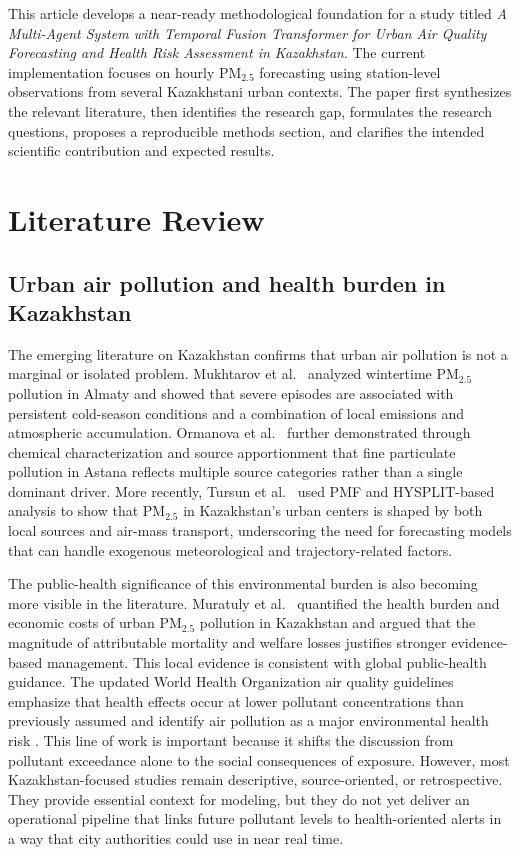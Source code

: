\documentclass[pdflatex,sn-mathphys-num]{sn-jnl}
\begin{document}
This article develops a near-ready methodological foundation for a study titled \textit{A Multi-Agent System with Temporal Fusion Transformer for Urban Air Quality Forecasting and Health Risk Assessment in Kazakhstan}. The current implementation focuses on hourly PM$_{2.5}$ forecasting using station-level observations from several Kazakhstani urban contexts. The paper first synthesizes the relevant literature, then identifies the research gap, formulates the research questions, proposes a reproducible methods section, and clarifies the intended scientific contribution and expected results.

\section{Literature Review}\label{sec:litreview}

\subsection{Urban air pollution and health burden in Kazakhstan}\label{subsec:kazakhstan}

The emerging literature on Kazakhstan confirms that urban air pollution is not a marginal or isolated problem. Mukhtarov et al.\ \cite{mukhtarov2023winter} analyzed wintertime PM$_{2.5}$ pollution in Almaty and showed that severe episodes are associated with persistent cold-season conditions and a combination of local emissions and atmospheric accumulation. Ormanova et al.\ \cite{ormanova2025astana} further demonstrated through chemical characterization and source apportionment that fine particulate pollution in Astana reflects multiple source categories rather than a single dominant driver. More recently, Tursun et al.\ \cite{tursun2025sources} used PMF and HYSPLIT-based analysis to show that PM$_{2.5}$ in Kazakhstan's urban centers is shaped by both local sources and air-mass transport, underscoring the need for forecasting models that can handle exogenous meteorological and trajectory-related factors.

The public-health significance of this environmental burden is also becoming more visible in the literature. Muratuly et al.\ \cite{muratuly2025health} quantified the health burden and economic costs of urban PM$_{2.5}$ pollution in Kazakhstan and argued that the magnitude of attributable mortality and welfare losses justifies stronger evidence-based management. This local evidence is consistent with global public-health guidance. The updated World Health Organization air quality guidelines emphasize that health effects occur at lower pollutant concentrations than previously assumed and identify air pollution as a major environmental health risk \cite{who2021airquality}. This line of work is important because it shifts the discussion from pollutant exceedance alone to the social consequences of exposure. However, most Kazakhstan-focused studies remain descriptive, source-oriented, or retrospective. They provide essential context for modeling, but they do not yet deliver an operational pipeline that links future pollutant levels to health-oriented alerts in a way that city authorities could use in near real time.
\end{document}
